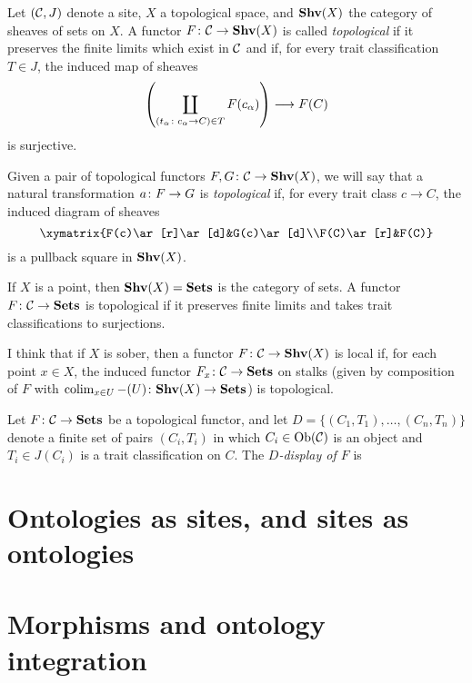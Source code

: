 \documentclass{amsart}
\def\Shv{{\bf Shv}}
\begin{document}
\begin{definition}

Let $(\mathcal{C},J)$ denote a site, $X$ a topological space, and $\Shv(X)$ the category of sheaves of sets on $X$.  A functor $F\taking\mcC\to\Shv(X)$ is called {\em topological} if it preserves the finite limits which exist in $\mathcal{C}$ and if, for every trait classification $T\in J$, the induced map of sheaves $$\left(\coprod_{(t_\alpha\colon c_\alpha\rightarrow C)\in T}F(c_\alpha)\right)\longrightarrow F(C)$$ is surjective.

Given a pair of topological functors $F,G\taking\mcC\to\Shv(X)$, we will say that a natural transformation $a\colon F\rightarrow G$ is {\em topological} if, for every trait class $c\to C$, the induced diagram of sheaves $$\xymatrix{F(c)\ar[r]\ar[d]&G(c)\ar[d]\\F(C)\ar[r]&F(C)}$$ is a pullback square in $\Shv(X)$.

\end{definition}

\begin{example}

If $X$ is a point, then $\Shv(X)=\Sets$ is the category of sets.  A functor $F\colon\mathcal{C}\rightarrow{\bf Sets}$ is topological if it preserves finite limits and takes trait classifications to surjections.

I think that if $X$ is sober, then a functor $F\taking\mcC\to\Shv(X)$ is local if, for each point $x\in X$, the induced functor $F_x\colon\mathcal{C}\rightarrow{\bf Sets}$ on stalks (given by composition of $F$ with $\colim_{x\in U}-(U)\taking\Shv(X)\to\Sets$) is topological.

\end{example}

\begin{definition}

Let $F\colon\mathcal{C}\rightarrow{\bf Sets}$ be a topological functor, and let $D=\{(C_1,T_1),\ldots,(C_n,T_n)\}$ denote a finite set of pairs $(C_i,T_i)$ in which $C_i\in\textnormal{Ob}(\mathcal{C})$ is an object and $T_i\in J(C_i)$ is a trait classification on $C$.  The {\em $D$-display of $F$} is 

\end{definition}

\section{Ontologies as sites, and sites as ontologies}\label{sec:connections}
\section{Morphisms and ontology integration}\label{sec:integration}
\end{document}
